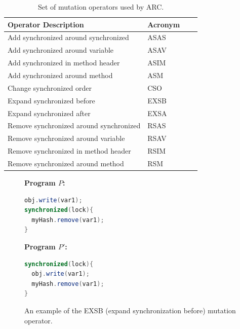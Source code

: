 \begin{table}[t!]
\caption{Set of mutation operators used by ARC.}
\begin{center}
\begin{tabular}{|l|l|c|c|}
\hline
\textbf{Operator Description} & \textbf{Acronym} \\
\hline
Add synchronized around synchronized & ASAS \\
\hline
Add synchronized around variable & ASAV \\
\hline
Add synchronized in method header & ASIM \\
\hline
Add synchronized around method & ASM  \\
\hline
Change synchronized order & CSO  \\
\hline
Expand synchronized before & EXSB  \\
\hline
Expand synchronized after & EXSA  \\
\hline
Remove synchronized around synchronized & RSAS  \\
\hline
Remove synchronized around variable & RSAV  \\
\hline
Remove synchronized in method header & RSIM  \\
\hline
Remove synchronized around method & RSM  \\
\hline
\end{tabular}
\label{tbl:operators}
\end{center}
\end{table}

\begin{figure}[b!]
\vspace{2mm}
\begin{minipage}{5cm}

\footnotesize{\textbf{ Program $P$:}}
\begin{lstlisting}[language=Java, morekeywords={synchronize}]
obj.write(var1);
synchronized(lock){
  myHash.remove(var1);
}
\end{lstlisting}
\end{minipage}\hfill
\begin{minipage}{5cm}
\footnotesize{\textbf{ Program $P'$:}}
\begin{lstlisting}[language=Java, morekeywords={synchronize}]
synchronized(lock){
  obj.write(var1);
  myHash.remove(var1);
}
\end{lstlisting}
\end{minipage}

\caption{An example of the EXSB (expand synchronization before) mutation
operator.}
\label{fig:EXSB_example}
\end{figure}

